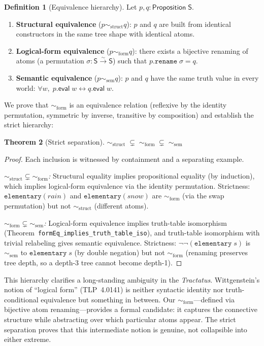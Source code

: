\documentclass[10pt, letterpaper]{article}
\newtheorem{theorem}{Theorem}[section]
\theoremstyle{definition}
\newtheorem{definition}[theorem]{Definition}
\theoremstyle{remark}
\newcommand{\Sach}{\mathsf{S}}
\newcommand{\eval}{\mathsf{eval}}
\newcommand{\structEq}{\sim_{\mathrm{struct}}}
\newcommand{\formEq}{\sim_{\mathrm{form}}}
\newcommand{\semEq}{\sim_{\mathrm{sem}}}
\begin{document}
\begin{definition}[Equivalence hierarchy]
\label{def:hierarchy}
Let $p, q : \mathsf{Proposition}\;\Sach$.
\begin{enumerate}[nosep]
  \item \textbf{Structural equivalence} ($p \structEq q$):
    $p$ and $q$ are built from identical constructors in the
    same tree shape with identical atoms.
  \item \textbf{Logical-form equivalence} ($p \formEq q$):
    there exists a bijective renaming of atoms (a permutation
    $\sigma : \Sach \xrightarrow{\sim} \Sach$) such that
    $p.\mathtt{rename}\;\sigma = q$.
  \item \textbf{Semantic equivalence} ($p \semEq q$):
    $p$ and $q$ have the same truth value in every world:
    $\forall w,\; p.\eval\;w \leftrightarrow q.\eval\;w$.
\end{enumerate}
\end{definition}

\noindent
We prove that $\formEq$ is an equivalence relation (reflexive by
the identity permutation, symmetric by inverse, transitive by
composition) and establish the strict hierarchy:

\begin{theorem}[Strict separation]
\label{thm:hierarchy}
$\structEq \;\subsetneq\; \formEq \;\subsetneq\; \semEq$
\end{theorem}

\begin{proof}
Each inclusion is witnessed by containment and a separating example.

\emph{$\structEq \subsetneq \formEq$:}
Structural equality implies propositional equality (by induction),
which implies logical-form equivalence via the identity
permutation.  Strictness: $\mathtt{elementary}(\mathit{rain})$
and $\mathtt{elementary}(\mathit{snow})$ are $\formEq$ (via the
swap permutation) but not $\structEq$ (different atoms).

\emph{$\formEq \subsetneq \semEq$:}
Logical-form equivalence implies truth-table isomorphism
(Theorem~\texttt{formEq\_implies\_truth\_table\_iso}), and
truth-table isomorphism with trivial relabeling gives semantic
equivalence.  Strictness: $\lnot\lnot(\mathtt{elementary}\;s)$
is $\semEq$ to $\mathtt{elementary}\;s$ (by double negation) but
not $\formEq$ (renaming preserves tree depth, so a depth-3 tree
cannot become depth-1).
\end{proof}

\noindent
This hierarchy clarifies a long-standing ambiguity in the
\emph{Tractatus}.  Wittgenstein's notion of ``logical form''
(TLP~4.0141) is neither syntactic identity nor truth-conditional
equivalence but something in between.  Our $\formEq$---defined
via bijective atom renaming---provides a formal candidate:
it captures the connective structure while abstracting over
which particular atoms appear.  The strict separation proves
that this intermediate notion is genuine, not collapsible into
either extreme.
\end{document}
